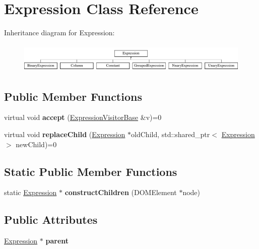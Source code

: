 \hypertarget{class_expression}{\section{Expression Class Reference}
\label{class_expression}
}
Inheritance diagram for Expression\+:\begin{figure}[H]
\begin{center}
\leavevmode
\includegraphics[height=1.424936cm]{class_expression}
\end{center}
\end{figure}
\subsection*{Public Member Functions}
\begin{DoxyCompactItemize}
\item 
\hypertarget{class_expression_ae2e6c802668a6329658b7c982f9c7b33}{virtual void {\bfseries accept} (\hyperlink{class_expression_visitor_base}{Expression\+Visitor\+Base} \&v)=0}\label{class_expression_ae2e6c802668a6329658b7c982f9c7b33}

\item 
\hypertarget{class_expression_a77ac16bbb0df93de8a7711b2f7de889f}{virtual void {\bfseries replace\+Child} (\hyperlink{class_expression}{Expression} $\ast$old\+Child, std\+::shared\+\_\+ptr$<$ \hyperlink{class_expression}{Expression} $>$ new\+Child)=0}\label{class_expression_a77ac16bbb0df93de8a7711b2f7de889f}

\end{DoxyCompactItemize}
\subsection*{Static Public Member Functions}
\begin{DoxyCompactItemize}
\item 
\hypertarget{class_expression_ae1968c4b3272019059f9a51e40d65c41}{static \hyperlink{class_expression}{Expression} $\ast$ {\bfseries construct\+Children} (D\+O\+M\+Element $\ast$node)}\label{class_expression_ae1968c4b3272019059f9a51e40d65c41}

\end{DoxyCompactItemize}
\subsection*{Public Attributes}
\begin{DoxyCompactItemize}
\item 
\hypertarget{class_expression_a36284ba467eae6aa796985ed909a6958}{\hyperlink{class_expression}{Expression} $\ast$ {\bfseries parent}}\label{class_expression_a36284ba467eae6aa796985ed909a6958}

\end{DoxyCompactItemize}


